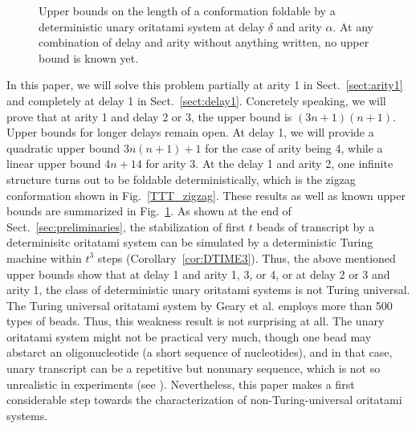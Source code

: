 \documentclass[runningheads]{llncs}
\begin{document}
\begin{figure}[tb]
\centering
{}
\caption{Upper bounds on the length of a conformation foldable by a deterministic unary oritatami system at delay $\delta$ and arity $\alpha$.
At any combination of delay and arity without anything written, no upper bound is known yet.
}
\label{fig:summary}
\end{figure}
In this paper, we will solve this problem partially at arity 1 in Sect.~\ref{sect:arity1} and completely at delay 1 in Sect.~\ref{sect:delay1}. 
Concretely speaking, we will prove that at arity 1 and delay 2 or 3, the upper bound is $(3n+1)(n+1)$. 
Upper bounds for longer delays remain open. 
At delay 1, we will provide a quadratic upper bound $3n(n+1)+1$ for the case of arity being 4, while a linear upper bound $4n+14$ for arity 3. 
At the delay 1 and arity 2, one infinite structure turns out to be foldable deterministically, which is the zigzag conformation shown in Fig.~\ref{TTT_zigzag}. 
These results as well as known upper bounds are summarized in Fig.~\ref{fig:summary}. 
As shown at the end of Sect.~\ref{sec:preliminaries}, the stabilization of first $t$ beads of transcript by a determinisitc oritatami system can be simulated by a deterministic Turing machine within $t^3$ steps (Corollary~\ref{cor:DTIME3}). 
Thus, the above mentioned upper bounds show that at delay 1 and arity 1, 3, or 4, or at delay 2 or 3 and arity 1, the class of deterministic unary oritatami systems is not Turing universal. 
The Turing universal oritatami system by Geary et al. \cite{GeMeScSe2018} employs more than 500 types of beads. 
Thus, this weakness result is not surprising at all. 
The unary oritatami system might not be practical very much, though one bead may abstarct an oligonucleotide (a short sequence of nucleotides), and in that case, unary transcript can be a repetitive but nonunary sequence, which is not so unrealistic in experiments (see \cite{GearyAndersen2014}). 
Nevertheless, this paper makes a first considerable step towards the characterization of non-Turing-universal oritatami systems. 
\end{document}
